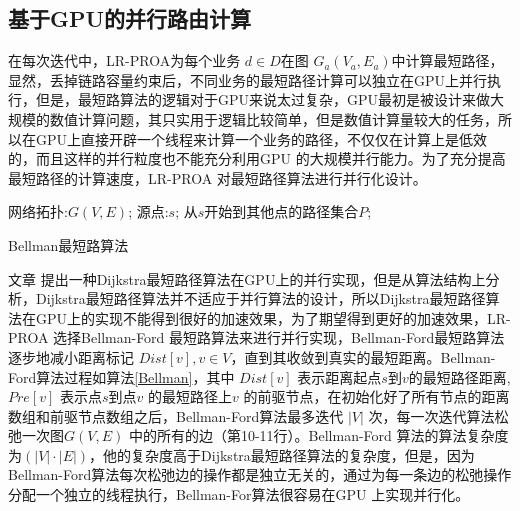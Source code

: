 \subsection{基于GPU的并行路由计算}
在每次迭代中，LR-PROA为每个业务 $d \in D$在图 $G_a(V_a, E_a)$中计算最短路径，显然，丢掉链路容量约束后，不同业务的最短路径计算可以独立在GPU上并行执行，但是，最短路算法的逻辑对于GPU来说太过复杂，GPU最初是被设计来做大规模的数值计算问题，其只实用于逻辑比较简单，但是数值计算量较大的任务，所以在GPU上直接开辟一个线程来计算一个业务的路径，不仅仅在计算上是低效的，而且这样的并行粒度也不能充分利用GPU 的大规模并行能力。为了充分提高最短路径的计算速度，LR-PROA 对最短路径算法进行并行化设计。
\begin{algorithm}[htb]
\begin{algorithmic}[1]
\Require
网络拓扑:$G(V, E)$;
源点:$s$;
\Ensure
从$s$开始到其他点的路径集合$P$;
\EndFor
{}
\EndIf
\EndFor
\EndWhile
{}
\end{algorithmic}
\caption{{Bellman最短路算法}}
\label{Bellman}
\end{algorithm}
文章 提出一种Dijkstra最短路径算法在GPU上的并行实现，但是从算法结构上分析，Dijkstra最短路径算法并不适应于并行算法的设计，所以Dijkstra最短路径算法在GPU上的实现不能得到很好的加速效果，为了期望得到更好的加速效果，LR-PROA 选择Bellman-Ford 最短路算法来进行并行实现，Bellman-Ford最短路算法逐步地减小距离标记 $Dist[v],v\in V$，直到其收敛到真实的最短距离。Bellman-Ford算法过程如算法\ref{Bellman}，其中 $Dist[v]$ 表示距离起点$s$到$v$的最短路径距离,$Pre[v]$ 表示点$s$到点$v$ 的最短路径上$v$ 的前驱节点，在初始化好了所有节点的距离数组和前驱节点数组之后，Bellman-Ford算法最多迭代 $|V|$ 次，每一次迭代算法松弛一次图$G(V, E)$ 中的所有的边（第10-11行）。Bellman-Ford 算法的算法复杂度为$(|V|\cdot |E|)$，他的复杂度高于Dijkstra最短路径算法的复杂度，但是，因为Bellman-Ford算法每次松弛边的操作都是独立无关的，通过为每一条边的松弛操作分配一个独立的线程执行，Bellman-For算法很容易在GPU 上实现并行化。
